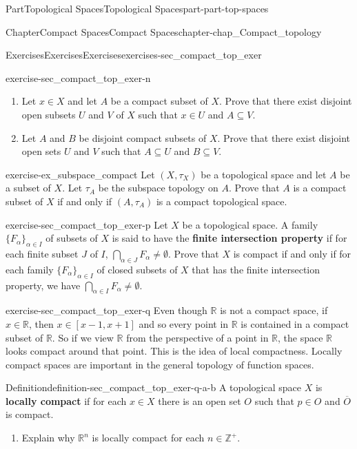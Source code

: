 \documentclass[oneside,10pt,]{book}
\newcommand{\terminology}[1]{\textbf{#1}}
\numberwithin{equation}{chapter}
\newcommand{\Z}{\mathbb{Z}}
\newcommand{\R}{\mathbb{R}}
\begin{document}
\begin{partptx}{Part}{Topological Spaces}{}{Topological Spaces}{}{}{part-part-top-spaces}
\begin{chapterptx}{Chapter}{Compact Spaces}{}{Compact Spaces}{}{}{chapter-chap_Compact_topology}
\begin{exercises-section}{Exercises}{Exercises}{}{Exercises}{}{}{exercises-sec_compact_top_exer}
\begin{divisionexercise}{13}{}{}{exercise-sec_compact_top_exer-n}
\begin{enumerate}[font=\bfseries,label=(\alph*),ref=\alph*]
\item{}Let \(x \in X\) and let \(A\) be a compact subset of \(X\). Prove that there exist disjoint open subsets \(U\) and \(V\) of \(X\) such that \(x \in U\) and \(A \subseteq V\).%
\item{}Let \(A\) and \(B\) be disjoint compact subsets of \(X\). Prove that there exist disjoint open sets \(U\) and \(V\) such that \(A \subseteq U\) and \(B \subseteq V\).%
\end{enumerate}%
\end{divisionexercise}%
\begin{divisionexercise}{14}{}{}{exercise-ex_subspace_compact}%
Let \((X,\tau_X)\) be a topological space and let \(A\) be a subset of \(X\). Let \(\tau_A\) be the subspace topology on \(A\). Prove that \(A\) is a compact subset of \(X\) if and only if \((A, \tau_A)\) is a compact topological space.%
\end{divisionexercise}%
\begin{divisionexercise}{15}{}{}{exercise-sec_compact_top_exer-p}%
Let \(X\) be a topological space. A family \(\{F_{\alpha}\}_{\alpha \in I}\) of subsets of \(X\) is said to have the \terminology{finite intersection property} if for each finite subset \(J\) of \(I\), \(\bigcap_{\alpha \in J} F_{\alpha} \neq \emptyset\). Prove that \(X\) is compact if and only if for each family \(\{F_{\alpha}\}_{\alpha \in I}\) of closed subsets of \(X\) that has the finite intersection property, we have \(\bigcap_{\alpha \in I} F_{\alpha} \neq \emptyset\).%
\end{divisionexercise}%
\begin{divisionexercise}{16}{}{}{exercise-sec_compact_top_exer-q}%
Even though \(\R\) is not a compact space, if \(x \in \R\), then \(x \in [x-1, x+1]\) and so every point in \(\R\) is contained in a compact subset of \(\R\). So if we view \(\R\) from the perspective of a point in \(\R\), the space \(\R\) looks compact around that point. This is the idea of local compactness. Locally compact spaces are important in the general topology of function spaces.%
\begin{definition}{Definition}{}{definition-sec_compact_top_exer-q-a-b}%
%
A topological space \(X\) is \terminology{locally compact} if for each \(x \in X\) there is an open set \(O\) such that \(p \in O\) and \(\overline{O}\) is compact.%
\end{definition}
\begin{enumerate}[font=\bfseries,label=(\alph*),ref=\alph*]%
\item{}Explain why \(\R^n\) is locally compact for each \(n \in \Z^+\).%

\end{enumerate}
\end{divisionexercise}
\end{exercises-section}
\end{chapterptx}
\end{partptx}
\end{document}
